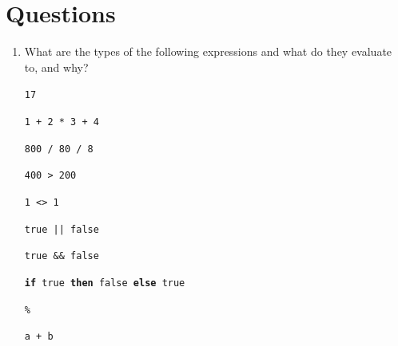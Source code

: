 \documentclass[]{book}
\newcommand\upquote[1]{\textquotesingle#1\textquotesingle}
\begin{document}
\section*{Questions}
\begin{enumerate}
\item What are the types of the following expressions and what do they evaluate to, and why?

\vspace{1mm}
\hspace{6mm}\texttt{17}

\hspace{6mm}\texttt{1 + 2 * 3 + 4}

\hspace{6mm}\texttt{800 / 80 / 8}

\hspace{6mm}\texttt{400 > 200}

\hspace{6mm}\texttt{1 <> 1}

\hspace{6mm}\texttt{true || false}

\hspace{6mm}\texttt{true \&\& false}

\hspace{6mm}\texttt{\textbf{if} true \textbf{then} false \textbf{else} true}

\hspace{6mm}\texttt{\upquote{\%}}

\hspace{6mm}\texttt{\upquote{a} + \upquote{b}}


\end{enumerate}
\end{document}
